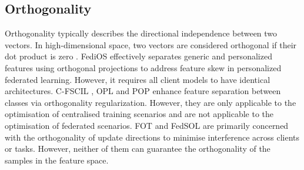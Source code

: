 \subsection{Orthogonality}
Orthogonality typically describes the directional independence between two vectors. In high-dimensional space, two vectors are considered orthogonal if their dot product is zero \cite{opl}. FediOS \cite{Fedios} effectively separates generic and personalized features using orthogonal projections to address feature skew in personalized federated learning. However, it requires all client models to have identical architectures. C-FSCIL \cite{C-FSCIL}, OPL \cite{opl} and POP \cite{POP} enhance feature separation between classes via orthogonality regularization. However, they are only applicable to the optimisation of centralised training scenarios and are not applicable to the optimisation of federated scenarios. FOT \cite{FOT} and FedSOL \cite{FedSOL} are primarily concerned with the orthogonality of update directions to minimise interference across clients or tasks. However, neither of them can guarantee the orthogonality of the samples in the feature space.